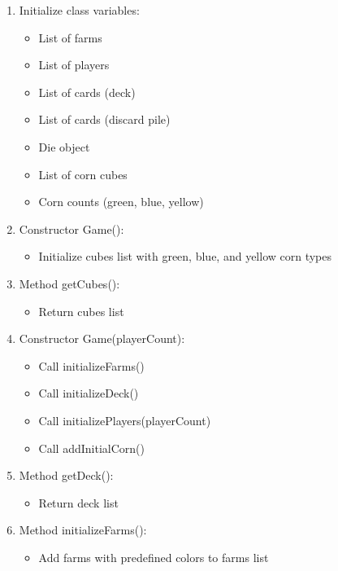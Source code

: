 \documentclass[conference]{IEEEtran}
\begin{document}
\begin{enumerate}
    \item Initialize class variables:
    \begin{itemize}
        \item List of farms
        \item List of players
        \item List of cards (deck)
        \item List of cards (discard pile)
        \item Die object
        \item List of corn cubes
        \item Corn counts (green, blue, yellow)
    \end{itemize}

    \item Constructor Game():
    \begin{itemize}
        \item Initialize cubes list with green, blue, and yellow corn types
    \end{itemize}

    \item Method getCubes():
    \begin{itemize}
        \item Return cubes list
    \end{itemize}

    \item Constructor Game(playerCount):
    \begin{itemize}
        \item Call initializeFarms()
        \item Call initializeDeck()
        \item Call initializePlayers(playerCount)
        \item Call addInitialCorn()
    \end{itemize}

    \item Method getDeck():
    \begin{itemize}
        \item Return deck list
    \end{itemize}

    \item Method initializeFarms():
    \begin{itemize}
        \item Add farms with predefined colors to farms list
    \end{itemize}


\end{enumerate}
\end{document}

